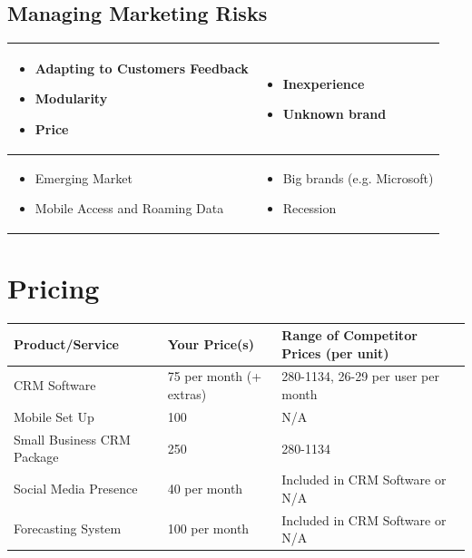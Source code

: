 \documentclass[DIV=calc, paper=a4, fontsize=11pt]{scrartcl}	 %
\begin{document}
\subsection{Managing Marketing Risks}
\begin{tabular}{|p{}|p{}|} \hline
\begin{itemize}
\item Adapting to Customers Feedback
\item Modularity
\item Price
\end{itemize} & 
\begin{itemize}
\item Inexperience
\item Unknown brand
\end{itemize}\\ \hline
\begin{itemize}
\item Emerging Market
\item Mobile Access and Roaming Data
\end{itemize} &
\begin{itemize}
\item Big brands (e.g. Microsoft)
\item Recession
\end{itemize} \\ \hline
\end{tabular}

\section{Pricing}

\begin{tabular}{|l|l|l|} \hline
Product/Service    & Your Price(s) & Range of Competitor Prices (per unit) \\ \hline
CRM Software       & 75 per month (+ extras)  & 280-1134, 26-29 per user per month \\ \hline
Mobile Set Up      & 100           & N/A \\ \hline
Small Business CRM Package & 250   & 280-1134 \\ \hline
Social Media Presence & 40 per month & Included in CRM Software or N/A \\ \hline
Forecasting System & 100 per month & Included in CRM Software or N/A \\ \hline
\end{tabular}
\end{document}
